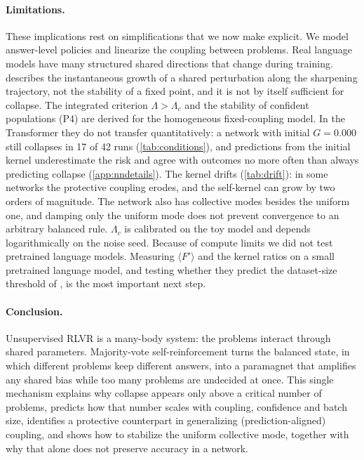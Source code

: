 \paragraph{Limitations.}
These implications rest on simplifications that we now make explicit.
We model answer-level policies and linearize the coupling between problems. Real language models have many structured shared directions that change during training.
 describes the instantaneous growth of a shared perturbation along the sharpening trajectory, not the stability of a fixed point, and it is not by itself sufficient for collapse. The integrated criterion $\Lambda>\Lambda_c$ and the stability of confident populations (P4) are derived for the homogeneous fixed-coupling model.
In the Transformer they do not transfer quantitatively: a network with initial $G=0.000$ still collapses in 17 of 42 runs (\cref{tab:conditions}), and predictions from the initial kernel underestimate the risk and agree with outcomes no more often than always predicting collapse (\cref{app:nndetails}). The kernel drifts (\cref{tab:drift}): in some networks the protective coupling erodes, and the self-kernel can grow by two orders of magnitude. The network also has collective modes besides the uniform one, and damping only the uniform mode does not prevent convergence to an arbitrary balanced rule.
$\Lambda_c$ is calibrated on the toy model and depends logarithmically on the noise seed.
Because of compute limits we did not test pretrained language models. Measuring $\langle F'\rangle$ and the kernel ratios on a small pretrained language model, and testing whether they predict the dataset-size threshold of \citet{he2026urlvr}, is the most important next step.

\paragraph{Conclusion.}
Unsupervised RLVR is a many-body system: the problems interact through shared parameters.
Majority-vote self-reinforcement turns the balanced state, in which different problems keep different answers, into a paramagnet that amplifies any shared bias while too many problems are undecided at once.
This single mechanism explains why collapse appears only above a critical number of problems, predicts how that number scales with coupling, confidence and batch size, identifies a protective counterpart in generalizing (prediction-aligned) coupling, and shows how to stabilize the uniform collective mode, together with why that alone does not preserve accuracy in a network.
